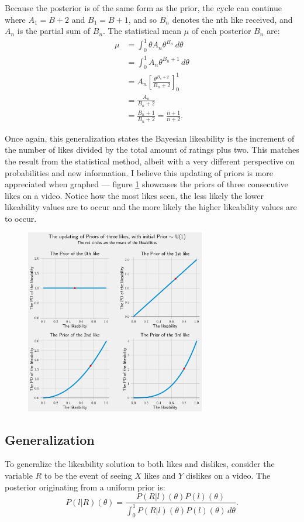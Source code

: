 \documentclass[a4paper,11pt]{article}
\begin{document}
Because the posterior is of the same form as the prior, the cycle can continue where $A_1 = B+2$ and $B_1 = B+1$, and so $B_n$ denotes the nth like received, and $A_n$ is the partial sum of $B_n$. The statistical mean $\mu$ of each posterior $B_n$ are:
\begin{align*}
    \mu &= \int_0^1 \theta A_n \theta^{B_n} \, d\theta\\
    &= \int_0^1 A_n \theta^{B_n + 1} \, d\theta\\
    &= A_n [\frac{\theta^{B_n+2}}{B_n+2}]^1_0\\
    &= \frac{A_n}{B_n+2}\\
    &= \frac{B_n+1}{B_n+2} = \frac{n+1}{n+2}.
\end{align*}

Once again, this generalization states the Bayesian likeability is the increment of the number of likes divided by the total amount of ratings plus two. This matches the result from the statistical method, albeit with a very different perspective on probabilities and new information. I believe this updating of priors is more appreciated when graphed --- figure \ref{fig:up} showcases the priors of three consecutive likes on a video. Notice how the most likes seen, the less likely the lower likeability values are to occur and the more likely the higher likeability values are to occur.

\begin{figure}[H]
    \centering
    \includegraphics[width=0.7\textwidth]{assets/updating_priors.png}
    \caption{}
    \label{fig:up}
\end{figure}

\subsection{Generalization}
To generalize the likeability solution to both likes and dislikes, consider the variable $R$ to be the event of seeing $X$ likes and $Y$ dislikes on a video. The posterior originating from a uniform prior is:
\[
    P(l|R)(\theta) = \frac{P(R|l)(\theta) P(l)(\theta)}{\int_0^1 P(R|l)(\theta) P(l)(\theta) \, d\theta}.
\]
\end{document}
